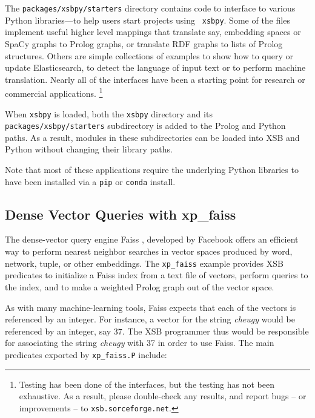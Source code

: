 The {\tt packages/xsbpy/starters} directory contains code to interface
to various Python libraries---to help users start projects using {\tt
  xsbpy}.  Some of the files implement useful higher level mappings
that translate say, embedding spaces or SpaCy graphs to Prolog graphs,
or translate RDF graphs to lists of Prolog structures.  Others are
simple collections of examples to show how to query or update
Elasticsearch, to detect the language of input text or to perform
machine translation.  Nearly all of the interfaces have been a
starting point for research or commercial
applications.  \footnote{Testing has been done of the interfaces, but
  the testing has not been exhaustive.  As a result, please
  double-check any results, and report bugs -- or improvements -- to
  {\tt xsb.sorceforge.net}.}

When {\tt xsbpy} is loaded, both the {\tt xsbpy} directory and its
{\tt packages/xsbpy/starters} subdirectory is added to the Prolog and
Python paths.  As a result, modules in these subdirectories can be
loaded into XSB and Python without changing their library paths.

Note that most of these applications require the underlying Python
libraries to have been installed via a {\tt pip} or {\tt conda}
install.

\subsection{Dense Vector Queries with xp\_faiss}
The dense-vector query engine Faiss \cite{JDH17}, developed by
Facebook offers an efficient way to perform nearest neighbor searches
in vector spaces produced by word, network, tuple, or other
embeddings.  The {\tt xp\_faiss} example provides XSB predicates to
initialize a Faiss index from a text file of vectors, perform queries
to the index, and to make a weighted Prolog graph out of the vector
space.  

As with many machine-learning tools, Faiss expects that each of the
vectors is referenced by an integer.  For instance, a vector for the
string {\em cheugy} would be referenced by an integer, say 37.  The
XSB programmer thus would be responsible for associating the string
{\em cheugy} with 37 in order to use Faiss.  The main predicates
exported by {\tt xp\_faiss.P} include:

